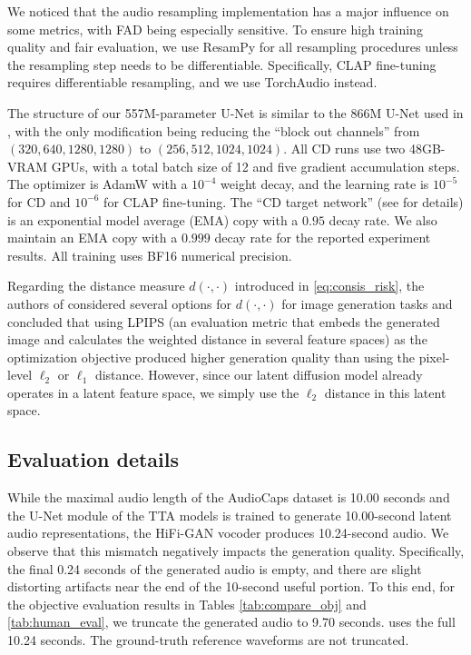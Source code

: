\documentclass{article}
\begin{document}
We noticed that the audio resampling implementation has a major influence on some metrics, with FAD being especially sensitive. To ensure high training quality and fair evaluation, we use ResamPy \cite{resampy} for all resampling procedures unless the resampling step needs to be differentiable. Specifically, CLAP fine-tuning requires differentiable resampling, and we use TorchAudio \cite{torchaudio} instead.

The structure of our 557M-parameter U-Net is similar to the 866M U-Net used in \cite{tango}, with the only modification being reducing the ``block out channels'' from $(320, 640, 1280, 1280)$ to $(256, 512, 1024, 1024)$. All CD runs use two 48GB-VRAM GPUs, with a total batch size of 12 and five gradient accumulation steps. The optimizer is AdamW with a $10^{-4}$ weight decay, and the learning rate is $10^{-5}$ for CD and $10^{-6}$ for CLAP fine-tuning. The ``CD target network'' (see \cite{cm} for details) is an exponential model average (EMA) copy with a $0.95$ decay rate. We also maintain an EMA copy with a $0.999$ decay rate for the reported experiment results. All training uses BF16 numerical precision.

Regarding the distance measure $d (\cdot, \cdot)$ introduced in \cref{eq:consis_risk}, the authors of \cite{cm} considered several options for $d (\cdot, \cdot)$ for image generation tasks and concluded that using LPIPS (an evaluation metric that embeds the generated image and calculates the weighted distance in several feature spaces) as the optimization objective produced higher generation quality than using the pixel-level $\ell_2$ or $\ell_1$ distance. However, since our latent diffusion model already operates in a latent feature space, we simply use the $\ell_2$ distance in this latent space.


\subsection{Evaluation details} \label{sec:human_details}

While the maximal audio length of the AudioCaps dataset is 10.00 seconds and the U-Net module of the TTA models is trained to generate 10.00-second latent audio representations, the HiFi-GAN vocoder produces 10.24-second audio. We observe that this mismatch negatively impacts the generation quality. Specifically, the final 0.24 seconds of the generated audio is empty, and there are slight distorting artifacts near the end of the 10-second useful portion. To this end, for the objective evaluation results in Tables \ref{tab:compare_obj} and \ref{tab:human_eval}, we truncate the generated audio to 9.70 seconds.  uses the full 10.24 seconds. The ground-truth reference waveforms are not truncated.
\end{document}
